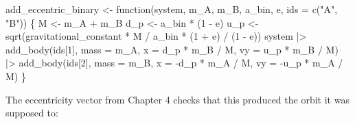 \documentclass[
  10.5pt,
  letterpaper,
]{scrbook}
\newenvironment{Shaded}{\begin{snugshade}}{\end{snugshade}}
\newcommand{\AttributeTok}[1]{\textcolor[rgb]{0.00,0.00,0.00}{#1}}
\newcommand{\ControlFlowTok}[1]{\textcolor[rgb]{0.00,0.00,0.00}{#1}}
\newcommand{\DecValTok}[1]{\textcolor[rgb]{0.00,0.00,0.00}{#1}}
\newcommand{\FunctionTok}[1]{\textcolor[rgb]{0.00,0.00,0.00}{#1}}
\newcommand{\NormalTok}[1]{\textcolor[rgb]{0.00,0.00,0.00}{#1}}
\newcommand{\OtherTok}[1]{\textcolor[rgb]{0.00,0.00,0.00}{#1}}
\newcommand{\SpecialCharTok}[1]{\textcolor[rgb]{0.00,0.00,0.00}{#1}}
\newcommand{\StringTok}[1]{\textcolor[rgb]{0.00,0.00,0.00}{#1}}
\theoremstyle{definition}
\theoremstyle{plain}
\theoremstyle{remark}
\begin{document}
\begin{Shaded}
\begin{Highlighting}[]
\NormalTok{add\_eccentric\_binary }\OtherTok{\textless{}{-}} \ControlFlowTok{function}\NormalTok{(system, m\_A, m\_B, a\_bin, e, }\AttributeTok{ids =} \FunctionTok{c}\NormalTok{(}\StringTok{"A"}\NormalTok{, }\StringTok{"B"}\NormalTok{)) \{}
\NormalTok{  M   }\OtherTok{\textless{}{-}}\NormalTok{ m\_A }\SpecialCharTok{+}\NormalTok{ m\_B}
\NormalTok{  d\_p }\OtherTok{\textless{}{-}}\NormalTok{ a\_bin }\SpecialCharTok{*}\NormalTok{ (}\DecValTok{1} \SpecialCharTok{{-}}\NormalTok{ e)}
\NormalTok{  u\_p }\OtherTok{\textless{}{-}} \FunctionTok{sqrt}\NormalTok{(gravitational\_constant }\SpecialCharTok{*}\NormalTok{ M }\SpecialCharTok{/}\NormalTok{ a\_bin }\SpecialCharTok{*}\NormalTok{ (}\DecValTok{1} \SpecialCharTok{+}\NormalTok{ e) }\SpecialCharTok{/}\NormalTok{ (}\DecValTok{1} \SpecialCharTok{{-}}\NormalTok{ e))}
\NormalTok{  system }\SpecialCharTok{|\textgreater{}}
    \FunctionTok{add\_body}\NormalTok{(ids[}\DecValTok{1}\NormalTok{], }\AttributeTok{mass =}\NormalTok{ m\_A, }\AttributeTok{x =}\NormalTok{  d\_p }\SpecialCharTok{*}\NormalTok{ m\_B }\SpecialCharTok{/}\NormalTok{ M, }\AttributeTok{vy =}\NormalTok{  u\_p }\SpecialCharTok{*}\NormalTok{ m\_B }\SpecialCharTok{/}\NormalTok{ M) }\SpecialCharTok{|\textgreater{}}
    \FunctionTok{add\_body}\NormalTok{(ids[}\DecValTok{2}\NormalTok{], }\AttributeTok{mass =}\NormalTok{ m\_B, }\AttributeTok{x =} \SpecialCharTok{{-}}\NormalTok{d\_p }\SpecialCharTok{*}\NormalTok{ m\_A }\SpecialCharTok{/}\NormalTok{ M, }\AttributeTok{vy =} \SpecialCharTok{{-}}\NormalTok{u\_p }\SpecialCharTok{*}\NormalTok{ m\_A }\SpecialCharTok{/}\NormalTok{ M)}
\NormalTok{\}}
\end{Highlighting}
\end{Shaded}

The eccentricity vector from Chapter 4 checks that this produced the
orbit it was supposed to:
\end{document}
